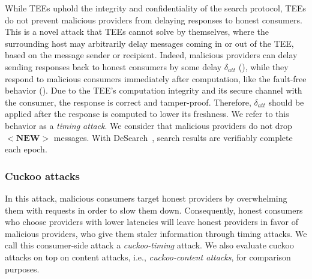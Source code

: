 While TEEs uphold the integrity and confidentiality of the search protocol, TEEs do not prevent malicious providers from delaying responses to honest consumers.
This is a novel attack that TEEs cannot solve by themselves, where the surrounding host may arbitrarily delay messages coming in or out of the TEE, based on the message sender or recipient.
Indeed, malicious providers can delay sending responses back to honest consumers by some delay $\delta_{att}$ (), while they respond to malicious consumers immediately after computation, like the fault-free behavior (). 
Due to the TEE's computation integrity and its secure channel with the consumer, the response is correct and tamper-proof. 
Therefore, $\delta_{att}$ should be applied after the response is computed to lower its freshness.
We refer to this behavior as a \emph{timing attack}.
We consider that malicious providers do not drop $\mathbf{<NEW>}$ messages.
With DeSearch~\cite{liBringingDecentralizedSearch2021}, search results are verifiably complete each epoch.

\subsubsection{Cuckoo attacks}

In this attack, malicious consumers target honest providers by overwhelming them with requests in order to slow them down.
Consequently, honest consumers who choose providers with lower latencies will leave honest providers in favor of malicious providers, who give them staler information through timing attacks.
We call this consumer-side attack a \emph{cuckoo-timing} attack.
We also evaluate cuckoo attacks on top on content attacks, i.e., \emph{cuckoo-content attacks}, for comparison purposes.
